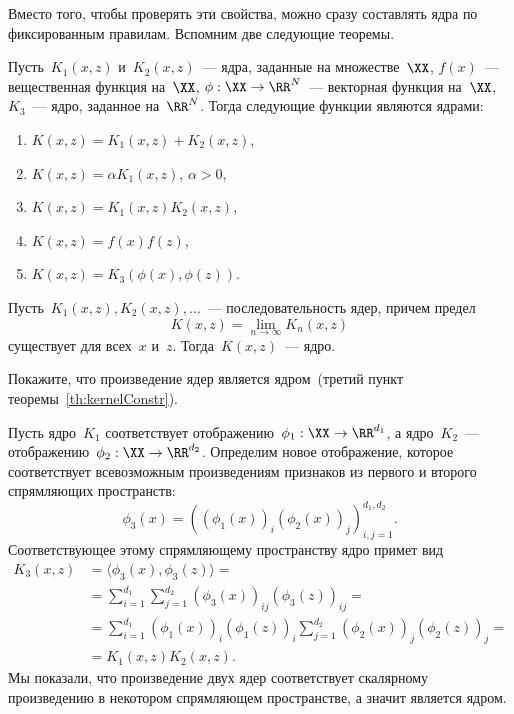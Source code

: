 \documentclass[12pt,fleqn]{article}
\begin{document}
Вместо того, чтобы проверять эти свойства, можно сразу составлять ядра по 
фиксированным правилам. Вспомним две следующие теоремы.

\begin{vkTheorem}
	\label{th:kernelConstr}
	Пусть~$K_1(x, z)$ и~$K_2(x, z)$~--- ядра, заданные на множестве~$\XX$,
	$f(x)$~--- вещественная функция на~$\XX$,
	$\phi: \XX \to \RR^N$~--- векторная функция на~$\XX$,
	$K_3$~--- ядро, заданное на~$\RR^N$.
	Тогда следующие функции являются ядрами:
	\begin{enumerate}
		\item $K(x, z) = K_1(x, z) + K_2(x, z)$,
		\item $K(x, z) = \alpha K_1(x, z)$, $\alpha > 0$,
		\item $K(x, z) = K_1(x, z) K_2(x, z)$,
		\item $K(x, z) = f(x) f(z)$,
		\item $K(x, z) = K_3(\phi(x), \phi(z))$.
	\end{enumerate}
\end{vkTheorem}

\begin{vkTheorem}
	\label{th:kernelLim}
	Пусть~$K_1(x, z), K_2(x, z), \dots$~--- последовательность ядер,
	причем предел
	\[
	K(x, z)
	=
	\lim_{n \to \infty}
	K_n(x, z)
	\]
	существует для всех~$x$ и~$z$.
	Тогда~$K(x, z)$~--- ядро.
\end{vkTheorem}

\begin{vkProblem}
	Покажите, что произведение ядер является ядром~(третий пункт
	теоремы~\ref{th:kernelConstr}).
\end{vkProblem}

\begin{esSolution}
	Пусть ядро~$K_1$ соответствует отображению~$\phi_1: \XX \to \RR^{d_1}$,
	а ядро~$K_2$~--- отображению~$\phi_2: \XX \to \RR^{d_2}$.
	Определим новое отображение, которое соответствует всевозможным
	произведениям признаков из первого и второго спрямляющих пространств:
	\[
	\phi_3(x)
	=
	\left(
	\left( \phi_1(x) \right)_i
	\left( \phi_2(x) \right)_j
	\right)_{i, j = 1}^{d_1, d_2}.
	\]
	Соответствующее этому спрямляющему пространству ядро примет вид
	\begin{align*}
		K_3(x, z)
		&=
		\langle \phi_3(x), \phi_3(z) \rangle
		=\\
		&=
		\sum_{i = 1}^{d_1} \sum_{j = 1}^{d_2}
		\left( \phi_3(x) \right)_{ij}
		\left( \phi_3(z) \right)_{ij}
		=\\
		&=
		\sum_{i = 1}^{d_1}
		\left( \phi_1(x) \right)_i
		\left( \phi_1(z) \right)_i
		\sum_{j = 1}^{d_2}
		\left( \phi_2(x) \right)_j
		\left( \phi_2(z) \right)_j
		=\\
		&=
		K_1(x, z) K_2(x, z).
	\end{align*}
	Мы показали, что произведение двух ядер соответствует скалярному
	произведению в некотором спрямляющем пространстве,
	а значит является ядром.
\end{esSolution}
\end{document}
